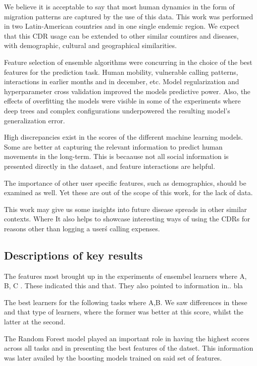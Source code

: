 We believe it is acceptable to say that most human dynamics in the form of migration patterns are captured by the use of this data.
This work was performed in two Latin-American countries and in one single endemic region.
We expect that this CDR usage can be extended to other similar countires and diseases, with demographic, cultural and geographical similarities.


Feature selection of ensemble algorithms were concurring in the choice of the best features for the prediction task.
Human mobility, vulnerable calling patterns, interactions in earlier months and in december, etc.
Model regularization and hyperparameter cross validation improved the models predictive power.
Also, the effects of overfitting the models were visible in some of the experiments where deep trees and complex configurations underpowered the resulting model's generalization error.



High discrepancies exist in the scores of the different machine learning models.
Some are better at capturing the relevant information to predict human movements in the long-term.
This is becaause not all social information is presented directly in the dataset, and feature interactions are helpful.


The importance of other user specific features, such as demographics, should be examined as well.
Yet these are out of the scope of this work, for the lack of data.


This work may give us some insights into future disease spreads in other similar contexts.
Where
It also helps to showcase interesting ways of using the CDRs for reasons other than logging a user\'s calling expenses.


\subsection{Descriptions of key results}



The features most brought up in the experiments of ensembel learners where A, B, C .
These indicated this and that.
They also pointed to information in.. bla


The best learners for the following tasks where A,B.
We saw differences in these and that type of learners, where the former was better at this score, whilst the latter at the second.

The Random Forest model played an important role in having the highest scores across all tasks and in presenting the best features of the datset.
This information was later availed by the boosting models trained on said set of features.










